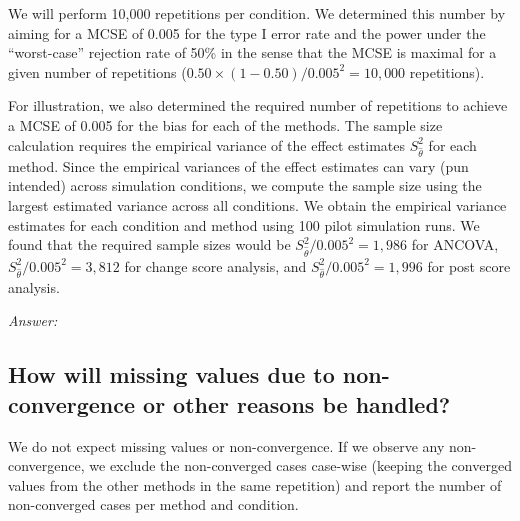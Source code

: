 \documentclass[12pt]{article}
\begin{document}
\begin{examplebox}
We will perform 10,000 repetitions per condition. We determined this number by aiming for a MCSE of 0.005 for the type I error rate and the power under the ``worst-case'' rejection rate of 50\% in the sense that the MCSE is maximal for a given number of repetitions ($0.50 \times (1 - 0.50) / 0.005^2 = 10{,}000$ repetitions).

For illustration, we also determined the required number of repetitions to achieve a MCSE of 0.005 for the bias for each of the methods. The sample size calculation requires the empirical variance of the effect estimates $S_{\hat{\theta}}^2$ for each method. Since the empirical variances of the effect estimates can vary (pun intended) across simulation conditions, we compute the sample size using the largest estimated variance across all conditions. We obtain the empirical variance estimates for each condition and method using 100 pilot simulation runs. We found that the required sample sizes would be $S_{\hat{\theta}}^2/0.005^2 = 1{,}986$ for ANCOVA, $S_{\hat{\theta}}^2/0.005^2 = 3{,}812$ for change score analysis, and $S_{\hat{\theta}}^2/0.005^2 = 1{,}996$ for post score analysis.
\end{examplebox}

\textit{Answer:}




\subsection{How will missing values due to non-convergence or other reasons be handled?}


\begin{examplebox}
We do not expect missing values or non-convergence. If we observe any non-convergence, we exclude the non-converged cases case-wise (keeping the converged values from the other methods in the same repetition) and report the number of non-converged cases per method and condition.
\end{examplebox}
\end{document}
